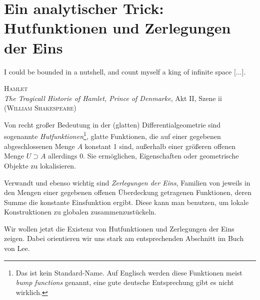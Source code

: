 \documentclass[a4paper]{scrreprt}
\numberwithin{equation}{chapter}
\theoremstyle{definition}
\begin{document}
\chapter{Ein analytischer Trick: Hutfunktionen und Zerlegungen der Eins}
\epigraph{I could be bounded in a nutshell, and count myself a king of infinite space [$\ldots$].}{\textsc{Hamlet}\\\emph{The Tragicall Historie of Hamlet, Prince of Denmarke}, Akt II, Szene ii\\(\textsc{William Shakespeare})}

Von recht großer Bedeutung in der (glatten) Differentialgeometrie sind sogenannte \emph{Hutfunktionen}\footnote{Das ist kein Standard-Name. Auf Englisch werden diese Funktionen meist \emph{bump functions}  genannt, eine gute deutsche Entsprechung gibt es nicht wirklich.}, glatte Funktionen, die auf einer gegebenen abgeschlossenen Menge $A$ konstant 1 sind, außerhalb einer größeren offenen Menge $U \supset A$ allerdings 0. Sie ermöglichen, Eigenschaften oder geometrische Objekte zu \glqq lokalisieren\grqq.

Verwandt und ebenso wichtig sind \emph{Zerlegungen der Eins}, Familien von jeweils in den Mengen einer gegebenen offenen Überdeckung getragenen Funktionen, deren Summe die konstante Einsfunktion ergibt. Diese kann man benutzen, um lokale Konstruktionen zu globalen \glqq zusammenzustückeln\grqq.

Wir wollen jetzt die Existenz von Hutfunktionen und Zerlegungen der Eins zeigen. Dabei orientieren wir uns stark am entsprechenden Abschnitt im Buch von Lee.

\end{document}
